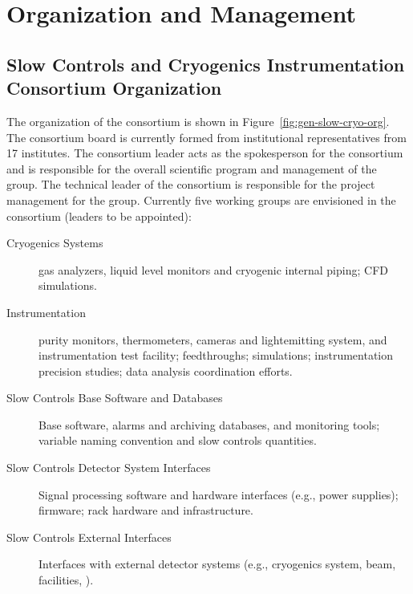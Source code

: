 \section{Organization and Management}
\label{sec:fdgen-slow-cryo-org}

\subsection{Slow Controls and Cryogenics Instrumentation Consortium Organization}
\label{sec:fdgen-slow-cryo-org-consortium}


The organization of the  consortium is shown in
Figure~\ref{fig:gen-slow-cryo-org}. The  consortium board is
currently formed from institutional representatives from \num{17} institutes. 
The consortium leader
acts as the spokesperson for the consortium and is responsible for the
overall scientific program and management of the group. The technical
leader of the consortium is responsible for the project management for
the group.  Currently five working groups are envisioned in the
consortium (leaders to be appointed):







\begin{description}
 \item[Cryogenics Systems] gas analyzers, liquid level
  monitors and cryogenic internal piping; CFD simulations.
 \item[\lar Instrumentation] purity monitors, thermometers,
   cameras and lightemitting system, and instrumentation test facility;
   feedthroughs; \efield simulations;
   instrumentation precision studies;
    data analysis coordination efforts.
 \item [Slow Controls Base Software and Databases]  Base software, alarms and archiving databases, and monitoring tools;
   variable naming convention and slow controls quantities.
 \item [Slow Controls Detector System Interfaces] Signal processing software and hardware interfaces (e.g., power supplies);
   firmware; rack hardware and infrastructure.   
 \item [Slow Controls External Interfaces] Interfaces with external detector systems (e.g., cryogenics system, beam, facilities, ).
\end{description}

